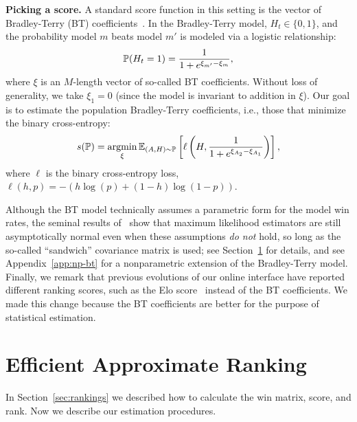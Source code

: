 \documentclass{article}
\begin{document}
\textbf{Picking a score.}
A standard score function in this setting is the vector of Bradley-Terry (BT) coefficients~\cite{bradley1952rank}.
In the Bradley-Terry model, $H_t \in \{0,1\}$, and the probability model $m$ beats model $m'$ is modeled via a logistic relationship:
\begin{equation}
    \P(H_t = 1) = \frac{1}{1+e^{\xi_{m'}-\xi_m}},
\end{equation}
where $\xi$ is an $M$-length vector of so-called BT coefficients.
Without loss of generality, we take $\xi_1 = 0$ (since the model is invariant to addition in $\xi$).
Our goal is to estimate the population Bradley-Terry coefficients, i.e., those that minimize the binary cross-entropy:
\begin{equation}
    \label{eq:population-BT}
    s(\P) = \argmin_{\xi} \E_{(A,H) \sim \P}\left[\ell\left(H, \frac{1}{1+e^{\xi_{A_2}-\xi_{A_1}}}\right)\right],
\end{equation}
where $\ell$ is the binary cross-entropy loss, $\ell(h,p) = -(h\log(p) + (1-h)\log(1-p))$.

Although the BT model technically assumes a parametric form for the model win rates, the seminal results of~\citet{huber1967behavior, white1982maximum} show that maximum likelihood estimators are still asymptotically normal even when these assumptions \emph{do not} hold, so long as the so-called ``sandwich'' covariance matrix is used; see Section~\ref{sec:efficient-estimation} for details, and see Appendix~\ref{app:np-bt} for a nonparametric extension of the Bradley-Terry model.
Finally, we remark that previous evolutions of our online interface have reported different ranking scores, such as the Elo score~\cite{elo1967proposed} instead of the BT coefficients.
We made this change because the BT coefficients are better for the purpose of statistical estimation.

\section{Efficient Approximate Ranking}
\label{sec:efficient-estimation}

In Section~\ref{sec:rankings} we described how to calculate the win matrix, score, and rank.
Now we describe our estimation procedures.
\end{document}
